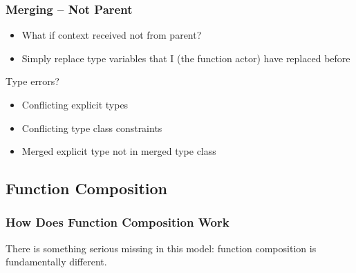 \documentclass{beamer}
\begin{document}
\begin{frame}
	\frametitle{Merging -- Not Parent}

	\begin{itemize}
		\item What if context received not from parent?
		\item Simply replace type variables that I (the function actor) have
			replaced before
	\end{itemize}

	Type errors?
	\begin{itemize}
		\item Conflicting explicit types
		\item Conflicting type class constraints
		\item Merged explicit type not in merged type class
	\end{itemize}
\end{frame}

\subsection{Function Composition}

\begin{frame}
  \frametitle{How Does Function Composition Work}
  
  There is something serious missing in this model: function
  composition is fundamentally different.
\end{frame}
\end{document}
